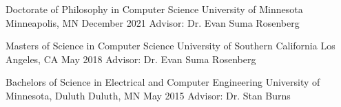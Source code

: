 
\begin{cventries}
  \cventry
    {Doctorate of Philosophy in Computer Science} %
    {University of Minnesota} %
    {Minneapolis, MN} %
    {December 2021} %
    {Advisor: Dr. Evan Suma Rosenberg}
    
  \cventry
    {Masters of Science in Computer Science} %
    {University of Southern California} %
    {Los Angeles, CA} %
    {May 2018} %
    {Advisor: Dr. Evan Suma Rosenberg}
    
  \cventry
    {Bachelors of Science in Electrical and Computer Engineering} %
    {University of Minnesota, Duluth} %
    {Duluth, MN} %
    {May 2015} %
    {Advisor: Dr. Stan Burns}
\end{cventries}

